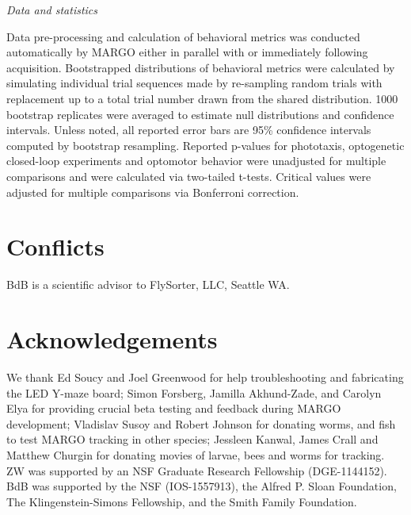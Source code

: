 \documentclass[10pt]{article}
\begin{document}
\begin{multicols}{2}
\vspace*{0.5cm}
\noindent\textit{Data and statistics}
\vspace*{0.3cm}

Data pre-processing and calculation of behavioral metrics was conducted automatically by MARGO either in parallel with or immediately following acquisition. Bootstrapped distributions of behavioral metrics were calculated by simulating individual trial sequences made by re-sampling random trials with replacement up to a total trial number drawn from the shared distribution. 1000 bootstrap replicates were averaged to estimate null distributions and confidence intervals. Unless noted, all reported error bars are 95\% confidence intervals computed by bootstrap resampling. Reported p-values for phototaxis, optogenetic closed-loop experiments and optomotor behavior were unadjusted for multiple comparisons and were calculated via two-tailed t-tests. Critical values were adjusted for multiple comparisons via Bonferroni correction.

\section*{Conflicts}

BdB is a scientific advisor to FlySorter, LLC, Seattle WA.

\section*{Acknowledgements}

We thank Ed Soucy and Joel Greenwood for help troubleshooting and fabricating the LED Y-maze board; Simon Forsberg, Jamilla Akhund-Zade, and Carolyn Elya for providing crucial beta testing and feedback during MARGO development; Vladislav Susoy and Robert Johnson for donating worms, and fish to test MARGO tracking in other species; Jessleen Kanwal, James Crall and Matthew Churgin for donating movies of larvae, bees and worms for tracking. ZW was supported by an NSF Graduate Research Fellowship (DGE-1144152). BdB was supported by the NSF (IOS-1557913), the Alfred P. Sloan Foundation, The Klingenstein-Simons Fellowship, and the Smith Family Foundation. 

 
\end{multicols}
\end{document}
